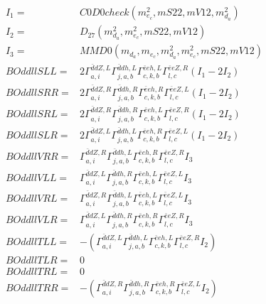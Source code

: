 \documentclass[A4,landscape]{article}
\begin{document}
\begin{align} 
I_1 = & C0D0check(m^2_{e_{{c}}}, mS22, mV12, m^2_{d_{{a}}}) \\ 
I_2 = & D_{27}(m^2_{d_{{a}}}, m^2_{e_{{c}}}, mS22, mV12) \\ 
I_3 = & MMD0(m_{d_{{a}}}, m_{e_{{c}}}, m^2_{d_{{a}}}, m^2_{e_{{c}}}, mS22, mV12) \\ 
  BOddllSLL= & 2  \Gamma^{\bar{d}d Z ,L}_{a, i} \Gamma^{\bar{d}d h ,L}_{j, a, b} \Gamma^{\bar{e}e h ,L}_{c, k, b} \Gamma^{\bar{e}e Z ,R}_{l, c} (I_1 - 2 I_2) \\ 
  BOddllSRR= & 2  \Gamma^{\bar{d}d Z ,R}_{a, i} \Gamma^{\bar{d}d h ,R}_{j, a, b} \Gamma^{\bar{e}e h ,R}_{c, k, b} \Gamma^{\bar{e}e Z ,L}_{l, c} (I_1 - 2 I_2) \\ 
  BOddllSRL= & 2  \Gamma^{\bar{d}d Z ,R}_{a, i} \Gamma^{\bar{d}d h ,R}_{j, a, b} \Gamma^{\bar{e}e h ,L}_{c, k, b} \Gamma^{\bar{e}e Z ,R}_{l, c} (I_1 - 2 I_2) \\ 
  BOddllSLR= & 2  \Gamma^{\bar{d}d Z ,L}_{a, i} \Gamma^{\bar{d}d h ,L}_{j, a, b} \Gamma^{\bar{e}e h ,R}_{c, k, b} \Gamma^{\bar{e}e Z ,L}_{l, c} (I_1 - 2 I_2) \\ 
  BOddllVRR= &  \Gamma^{\bar{d}d Z ,R}_{a, i} \Gamma^{\bar{d}d h ,L}_{j, a, b} \Gamma^{\bar{e}e h ,R}_{c, k, b} \Gamma^{\bar{e}e Z ,R}_{l, c} I_3 \\ 
  BOddllVLL= &  \Gamma^{\bar{d}d Z ,L}_{a, i} \Gamma^{\bar{d}d h ,R}_{j, a, b} \Gamma^{\bar{e}e h ,L}_{c, k, b} \Gamma^{\bar{e}e Z ,L}_{l, c} I_3 \\ 
  BOddllVRL= &  \Gamma^{\bar{d}d Z ,R}_{a, i} \Gamma^{\bar{d}d h ,L}_{j, a, b} \Gamma^{\bar{e}e h ,L}_{c, k, b} \Gamma^{\bar{e}e Z ,L}_{l, c} I_3 \\ 
  BOddllVLR= &  \Gamma^{\bar{d}d Z ,L}_{a, i} \Gamma^{\bar{d}d h ,R}_{j, a, b} \Gamma^{\bar{e}e h ,R}_{c, k, b} \Gamma^{\bar{e}e Z ,R}_{l, c} I_3 \\ 
  BOddllTLL= & -( \Gamma^{\bar{d}d Z ,L}_{a, i} \Gamma^{\bar{d}d h ,L}_{j, a, b} \Gamma^{\bar{e}e h ,L}_{c, k, b} \Gamma^{\bar{e}e Z ,R}_{l, c} I_2) \\ 
  BOddllTLR= & 0 \\ 
  BOddllTRL= & 0 \\ 
  BOddllTRR= & -( \Gamma^{\bar{d}d Z ,R}_{a, i} \Gamma^{\bar{d}d h ,R}_{j, a, b} \Gamma^{\bar{e}e h ,R}_{c, k, b} \Gamma^{\bar{e}e Z ,L}_{l, c} I_2) \\ 
\end{align} 
\end{document}
